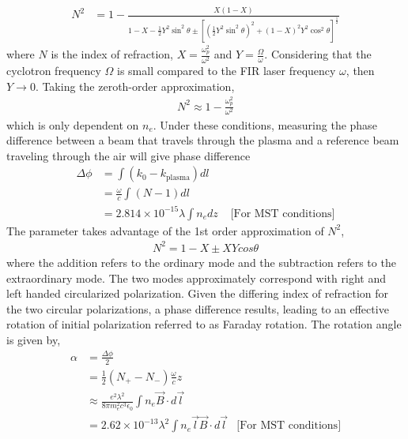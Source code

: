 \begin{align}
    N^2 &= 1 - \frac{X(1-X)}{1-X-\frac{1}{2}Y^2 \sin^2\theta\pm [(\frac{1}{2}Y^2\sin^2\theta)^2 + (1-X)^2Y^2\cos^2\theta]^{\frac{1}{2}}}
\end{align}
where $N$ is the index of refraction, $X = \frac{\omega_p^2}{\omega^2}$ and $Y = \frac{\Omega}{\omega}$. Considering that the cyclotron frequency $\Omega$ is small compared to the FIR laser frequency $\omega$, then $Y \rightarrow 0$. Taking the zeroth-order approximation\cite{Hutchinson_2002},
\begin{align}
N^2 \approx 1 - \frac{\omega_p^2}{\omega^2}
\end{align}
which is only dependent on $n_e$. Under these conditions, measuring the phase difference between a beam that travels through the plasma and a reference beam traveling through the air will give phase difference
\begin{align}
    \Delta\phi &= \int(k_0 - k_{\text{plasma}})dl \nonumber\\
    &= \frac{\omega}{c}\int(N - 1)dl \nonumber \\
    &= 2.814\times10^{-15}\lambda\int n_e dz 
    &\text{\ [For MST conditions]}
\end{align}
The parameter takes advantage of the 1st order approximation of $N^2$,
\begin{align}
    N^2 = 1 - X \pm XY cos \theta
\end{align}
where the addition refers to the ordinary mode and the subtraction refers to the extraordinary mode. The two modes approximately correspond with right and left handed circularized polarization. Given the differing index of refraction for the two circular polarizations, a phase difference results, leading to an effective rotation of initial polarization referred to as Faraday rotation. The rotation angle is given by,
\begin{align}
    \alpha &= \frac{\Delta \phi}{2}\nonumber\\
    &= \frac{1}{2}(N_+ - N_-)\frac{\omega}{c}z \\
    &\approx \frac{e^2 \lambda^2}{8\pi m^2_e c^3 \epsilon_0}\int n_e \vec{B}\cdot d\vec{l} \nonumber \\
    &= 2.62\times10^{-13}\lambda^2\int n_e{\vec{l}}\vec{B}\cdot d\vec{l} &\text{[For MST conditions]}
\end{align}

